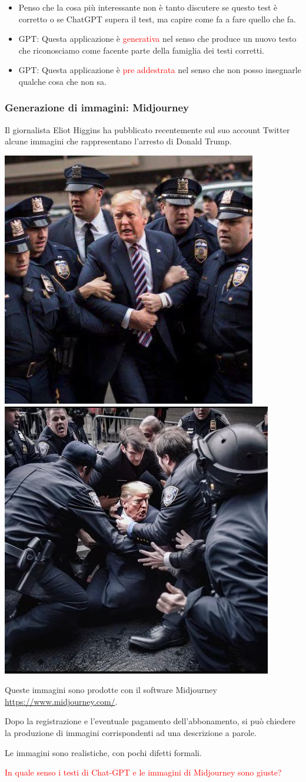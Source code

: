\documentclass[xcolor=svgnames]{beamer}
\newcommand{\rosso}[1]{\textcolor{red}{#1}}
\renewcommand{\emph}{\rosso}
\begin{document}
\begin{frame}
\begin{itemize}
\item Penso che la cosa più interessante non è tanto discutere se questo test è corretto o se ChatGPT supera il test, ma capire come fa a fare quello che fa.

\item GPT: Questa applicazione è \emph{generativa} nel senso che produce un nuovo testo che riconosciamo come facente parte della famiglia dei testi corretti.
\item GPT: Questa applicazione è \emph{pre addestrata} nel senso che non posso insegnarle qualche cosa che non sa.

\end{itemize}

\end{frame}

\begin{frame}[plain]\small\frametitle{Generazione di immagini: Midjourney}
Il giornalista Eliot Higgins ha pubblicato recentemente sul suo account Twitter alcune immagini che rappresentano l'arresto di Donald Trump.

  \includegraphics[width=.4\textwidth]{pictures/trump-1.jpg}  \hfill 
   \includegraphics[width=.4\textwidth]{pictures/trump-2.jpg}  


    Queste immagini sono prodotte con il software Midjourney \url{https://www.midjourney.com/}. 
    
    Dopo la registrazione e l'eventuale pagamento dell'abbonamento, si può chiedere la produzione di immagini corrispondenti ad una descrizione a parole.

Le immagini sono realistiche, con pochi difetti formali.  

    \emph{In quale senso i testi di Chat-GPT  e le immagini di Midjourney sono giuste?}

  \end{frame}
\end{document}
